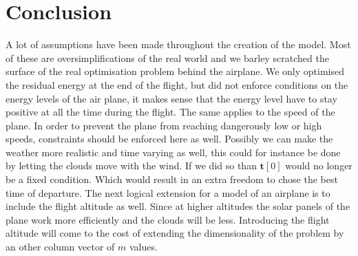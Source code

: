 \section{Conclusion}
A lot of assumptions have been made throughout the creation of the model.
Most of these are oversimplifications of the real world and we barley scratched the surface of the real optimisation problem behind the airplane.
We only optimised the residual energy at the end of the flight, but did not enforce conditions on the energy levels of the air plane, it makes sense that the energy level have to stay positive at all the time during the flight.
The same applies to the speed of the plane.
In order to prevent the plane from reaching dangerously low or high speeds, constraints should be enforced here as well.
Possibly we can make the weather more realistic and time varying as well, this could for instance be done by letting the clouds move with the wind.
If we did so than $ \mathbf{t}[0] $ would no longer be a fixed condition.
Which would result in an extra freedom  to chose the best time of departure.
The next logical extension for a model of an airplane is to include the flight altitude as well.
Since at higher altitudes the solar panels of the plane work more efficiently and the clouds will be less.
Introducing the flight altitude will come to the cost of extending the dimensionality of the problem by an other column vector of $ m $ values.




